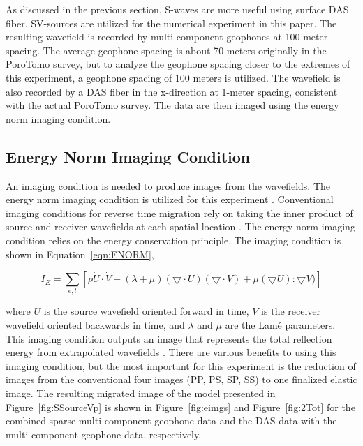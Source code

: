 As discussed in the previous section, S-waves are more useful using surface DAS fiber. SV-sources are utilized for the numerical experiment in this paper. The resulting wavefield is recorded by multi-component geophones at 100 meter spacing. The average geophone spacing is about 70 meters originally in the PoroTomo survey, but to analyze the geophone spacing closer to the extremes of this experiment, a geophone spacing of 100 meters is utilized. The wavefield is also recorded by a DAS fiber in the x-direction at 1-meter spacing, consistent with the actual PoroTomo survey. The data are then imaged using the energy norm imaging condition.

\subsection{Energy Norm Imaging Condition}
An imaging condition is needed to produce images from the wavefields. The energy norm imaging condition is utilized for this experiment \citep{rocha2016isotropic}. Conventional imaging conditions for reverse time migration rely on taking the inner product of source and receiver wavefields at each spatial location \citep{claerbout1985imaging}. The energy norm imaging condition relies on the energy conservation principle.  The imaging condition is shown in Equation~\ref{eqn:ENORM},

\begin{equation}
I_E=\sum_{e,t} [\rho \dot{U} \cdot \dot{V} + (\lambda + \mu)(\bigtriangledown \cdot U)(\bigtriangledown \cdot V)+ \mu (\bigtriangledown U):\bigtriangledown V)]
\label{eqn:ENORM}
\end{equation}

where $U$ is the source wavefield oriented forward in time, $V$ is the receiver wavefield oriented backwards in time, and $λ$ and $μ$ are the Lam\'e parameters. This imaging condition outputs an image that represents the total reflection energy from extrapolated wavefields \citep{rocha2016isotropic}. There are various benefits to using this imaging condition, but the most important for this experiment is the reduction of images from the conventional four images (PP, PS, SP, SS) to one finalized elastic image. The resulting migrated image of the model presented in Figure~\ref{fig:SSourceVp} is shown in Figure~\ref{fig:eimgs} and Figure~\ref{fig:2Tot} for the combined sparse multi-component geophone data and the DAS data with the multi-component geophone data, respectively.


